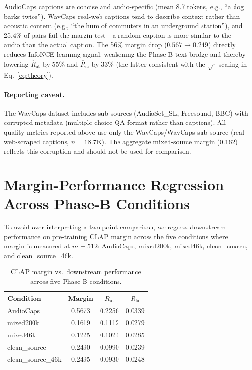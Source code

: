 \documentclass{article}
\newcommand{\avgR}{\overline{R}}
\begin{document}
AudioCaps captions are concise and audio-specific (mean 8.7 tokens, e.g., ``a dog barks twice'').
WavCaps real-web captions tend to describe context rather than acoustic content (e.g., ``the hum of commuters in an underground station''), and 25.4\% of pairs fail the margin test---a random caption is more similar to the audio than the actual caption.
The 56\% margin drop ($0.567 \to 0.249$) directly reduces InfoNCE learning signal, weakening the Phase B text bridge and thereby lowering $\avgR_\mathrm{at}$ by 55\% and $\avgR_\mathrm{ia}$ by 33\% (the latter consistent with the $\sqrt{\cdot}$ scaling in Eq.~\ref{eq:theory}).

\paragraph{Reporting caveat.}
The WavCaps dataset includes sub-sources (AudioSet\_SL, Freesound, BBC) with corrupted metadata (multiple-choice QA format rather than captions).
All quality metrics reported above use only the WavCaps/WavCaps sub-source (real web-scraped captions, $n=18.7$K).
The aggregate mixed-source margin (0.162) reflects this corruption and should not be used for comparison.

\section{Margin-Performance Regression Across Phase-B Conditions}
\label{app:quality_reg}

To avoid over-interpreting a two-point comparison, we regress downstream performance on pre-training CLAP margin across the five conditions where margin is measured at $m=512$:
AudioCaps, mixed200k, mixed46k, clean\_source, and clean\_source\_46k.

\begin{table}[ht]
  \caption{CLAP margin vs.\ downstream performance across five Phase-B conditions.}
  \label{tab:margin_reg}
  \centering
  \footnotesize
  \begin{tabular}{lccc}
    \toprule
    Condition & Margin & $\avgR_\mathrm{at}$ & $\avgR_\mathrm{ia}$ \\
    \midrule
    AudioCaps & 0.5673 & 0.2256 & 0.0339 \\
    mixed200k & 0.1619 & 0.1112 & 0.0279 \\
    mixed46k & 0.1225 & 0.1024 & 0.0285 \\
    clean\_source & 0.2490 & 0.0990 & 0.0239 \\
    clean\_source\_46k & 0.2495 & 0.0930 & 0.0248 \\
    \bottomrule
  \end{tabular}
\end{table}
\end{document}
